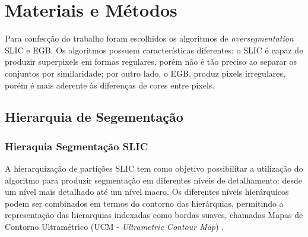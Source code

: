 \begin{document}

\section{Materiais e Métodos} \label{sec:mat_metodos}

Para confecção do trabalho foram escolhidos os algoritmos de \textit{oversegmentation} SLIC e EGB. Os algoritmos possuem características diferentes: o SLIC é capaz de produzir superpixels em formas regulares, porém não é tão preciso ao separar os conjuntos por similaridade; por outro lado, o EGB, produz pixels irregulares, porém é mais aderente às diferenças de cores entre pixels.



\subsection{Hierarquia de Segementação} \label{ssec:hierquia_segm}


\subsubsection{Hieraquia Segmentação SLIC} \label{sssec:hierq_segm_slic}

A hierarquização de partições SLIC tem como objetivo possibilitar a utilização do algoritmo para produzir segmentação em diferentes níveis de detalhamento: desde um nível mais detalhado até um nível macro. Os diferentes níveis hierárquicos podem ser combinados em termos do contorno das hierárquias, permitindo a representação das hierarquias indexadas como bordas suaves, chamadas Mapas de Contorno Ultramétrico (UCM - \textit{Ultrametric Contour Map}) \cite{ULTRAMETRIC}.
\end{document}
